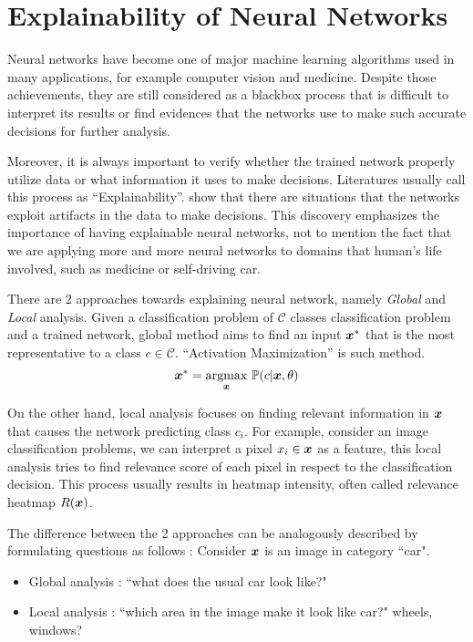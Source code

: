 \section{Explainability of Neural Networks}
Neural networks have become one of major machine learning algorithms used in many applications, for example computer vision and medicine. Despite those achievements, they are still considered as a blackbox process that is  difficult to interpret its results or find evidences that the networks use to make such accurate decisions for further analysis.

Moreover, it is always important to verify whether the trained network properly utilize data or what information it uses to make decisions. Literatures usually call this process as ``Explainability''.  \cite{BachAnalyzingclassifiersFisher2016} show that there are situations that the networks exploit artifacts in the data to make decisions. This discovery emphasizes the importance of having explainable neural networks, not to mention the fact that we are applying more and more neural networks to domains that human's life involved, such as medicine or self-driving car.

There are 2 approaches towards explaining neural network, namely \textit{Global} and \textit{Local} analysis. Given a  classification problem of $\mathcal{C}$ classes classification problem and a trained network, global method aims to find an input $\patvector{x}^*$ that is the most representative to a class $c \in \mathcal{C}$. ``Activation Maximization\cite{ErhanUnderstandingRepresentationsLearned2010}'' is such method.
$$
\patvector{x}^*  = \patarg{max}{\patvector{x}}  \mathbb{P}( c |\patvector{x},\theta)
$$

On the other hand, local analysis focuses on finding relevant information in $\patvector{x}$ that causes the network predicting class $c_i$.  For example, consider an image classification problems, we can interpret a pixel $x_i \in \patvector{x}$ as a feature, this local analysis tries to find relevance score of each pixel in respect to the classification decision. This process usually results in heatmap intensity, often called relevance heatmap $R(\patvector{x})$.

The difference  between the 2 approaches can be analogously described by formulating questions as follows : Consider $\patvector{x}$ is an image in category ``car".
\begin{itemize}
	\item Global analysis : ``what does the usual car look like?"
    \item Local analysis : ``which area in the image make it look like car?" wheels, windows?
\end{itemize}


